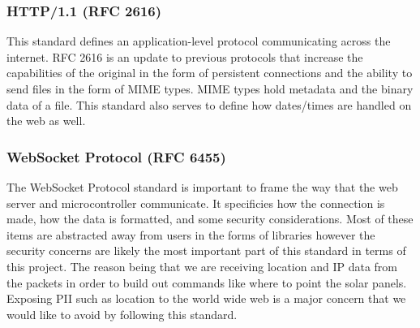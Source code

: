 \subsubsection{HTTP/1.1 (RFC 2616)}
This standard defines an application-level protocol communicating across the internet. RFC 2616 is an update to previous protocols that increase the capabilities of the original in the form of persistent connections and the ability to send files in the form of MIME types. MIME types hold metadata and the binary data of a file. This standard also serves to define how dates/times are handled on the web as well.
\subsubsection{WebSocket Protocol (RFC 6455)}
The WebSocket Protocol standard is important to frame the way that the web server and microcontroller communicate. It specificies how the connection is made, how the data is formatted, and some security considerations. Most of these items are abstracted away from users in the forms of libraries however the security concerns are likely the most important part of this standard in terms of this project. The reason being that we are receiving location and IP data from the packets in order to build out commands like where to point the solar panels. Exposing PII such as location to the world wide web is a major concern that we would like to avoid by following this standard.